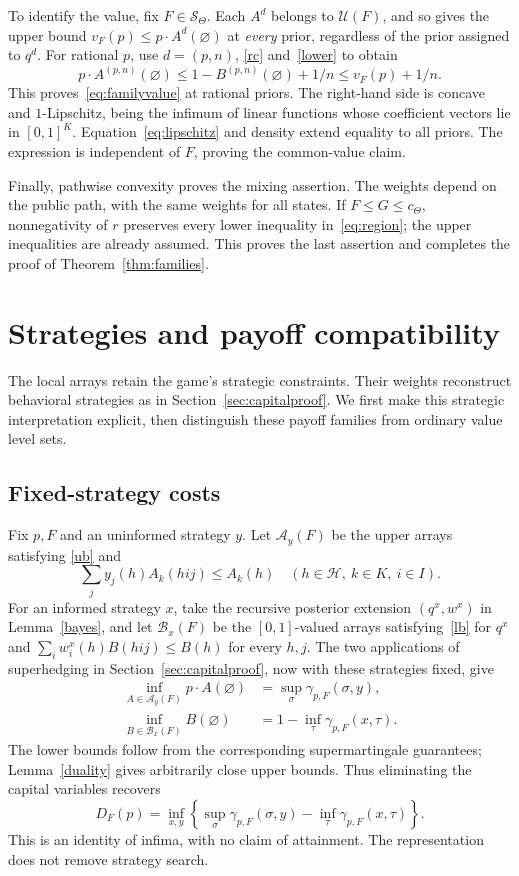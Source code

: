 \documentclass[11pt,a4paper]{article}
\theoremstyle{definition}
\theoremstyle{remark}
\newcommand{\HH}{\mathcal H}
\newcommand{\UU}{\mathcal U}
\begin{document}
To identify the value, fix $F\in\mathcal S_\Theta$. Each $A^d$
belongs to $\UU(F)$, and so gives the upper bound
$v_F(p)\leq p\cdot A^d(\varnothing)$ at \emph{every} prior, regardless
of the prior assigned to $q^d$. For rational $p$, use $d=(p,n)$,
\eqref{rc} and~\eqref{lower} to obtain
\[
 p\cdot A^{(p,n)}(\varnothing)
 \leq1-B^{(p,n)}(\varnothing)+1/n\leq v_F(p)+1/n.
\]
This proves~\eqref{eq:familyvalue} at rational priors. The right-hand
side is concave and $1$-Lipschitz, being the infimum of linear
functions whose coefficient vectors lie in $[0,1]^K$.
Equation~\eqref{eq:lipschitz} and density extend equality to all priors.
The expression is independent of $F$, proving the common-value claim.

Finally, pathwise convexity proves the mixing assertion. The weights
depend on the public path, with the same weights for all states.
If $F\leq G\leq c_\Theta$, nonnegativity of $r$ preserves every
lower inequality in~\eqref{eq:region}; the upper inequalities are
already assumed. This proves the last assertion and completes the
proof of Theorem~\ref{thm:families}.

\section{Strategies and payoff compatibility}\label{sec:examples}

The local arrays retain the game's strategic constraints. Their
weights reconstruct behavioral strategies as in Section~\ref{sec:capitalproof}.
We first make this strategic interpretation explicit, then distinguish
these payoff families from ordinary value level sets.

\subsection{Fixed-strategy costs}

Fix $p,F$ and an uninformed strategy $y$. Let $\mathcal A_y(F)$ be
the upper arrays satisfying \eqref{ub} and
\[
 \sum_jy_j(h)A_k(hij)\leq A_k(h)\quad(h\in\HH,\ k\in K,\ i\in I).
\]
For an informed strategy $x$, take the recursive posterior extension
$(q^x,w^x)$ in Lemma~\ref{bayes}, and let $\mathcal B_x(F)$ be
the $[0,1]$-valued arrays satisfying~\eqref{lb} for $q^x$ and
$\sum_iw_i^x(h)B(hij)\leq B(h)$ for every $h,j$.
The two applications of superhedging in Section~\ref{sec:capitalproof},
now with these strategies fixed, give
\begin{align}
 \inf_{A\in\mathcal A_y(F)}p\cdot A(\varnothing)
       &=\sup_\sigma\gamma_{p,F}(\sigma,y),\label{eq:fixedupper}\\
 \inf_{B\in\mathcal B_x(F)}B(\varnothing)
       &=1-\inf_\tau\gamma_{p,F}(x,\tau).\label{eq:fixedlower}
\end{align}
The lower bounds follow from the corresponding supermartingale
guarantees; Lemma~\ref{duality} gives arbitrarily close upper
bounds. Thus eliminating the capital variables recovers
\[
 D_F(p)=\inf_{x,y}\left\{
       \sup_\sigma\gamma_{p,F}(\sigma,y)
       -\inf_\tau\gamma_{p,F}(x,\tau)\right\}.
\]
This is an identity of infima, with no claim of attainment. The
representation does not remove strategy search.
\end{document}
